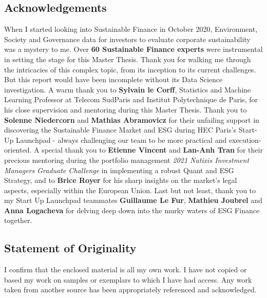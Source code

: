 \documentclass[12pt]{report}
\begin{document}
\begin{titlepage}
\section*{Acknowledgements}
When I started looking into Sustainable Finance in October 2020, Environment, Society and Governance data for investors to evaluate corporate sustainability was a mystery to me. Over \textbf{60 Sustainable Finance experts} were instrumental in setting the stage for this Master Thesis. Thank you for walking me through the intricacies of this complex topic, from its inception to its current challenges.\newline
\newline
But this report would have been incomplete without its Data Science investigation. A warm thank you to \textbf{Sylvain le Corff}, Statistics and Machine Learning Professor at Telecom SudParis and Institut Polytechnique de Paris, for his close supervision and mentoring during this Master Thesis.\newline  
Thank you to \textbf{Solenne Niedercorn} and \textbf{Mathias Abramovicz} for their unfailing support in discovering the Sustainable Finance Market and ESG during HEC Paris's Start-Up Launchpad - always challenging our team to be more practical and execution-oriented.\newline 
A special thank you to \textbf{Etienne Vincent} and \textbf{Lan-Anh Tran} for their precious mentoring during the portfolio management \textit{2021 Natixis Investment Managers Graduate Challenge} in implementing a robust Quant and ESG Strategy, and to  \textbf{Brice Royer} for his sharp insights on the market's legal aspects, especially within the European Union.
\newline
\newline
Last but not least, thank you to my Start Up Launchpad teammates \textbf{Guillaume Le Fur}, \textbf{Mathieu Joubrel} and \textbf{Anna Logacheva} for delving deep down into the murky waters of ESG Finance together.
\end{titlepage}
\begin{titlepage}
\section*{Statement of Originality}
I confirm that the enclosed material is all my own work. I have not copied or based my work on samples or exemplars to which I have had access. Any work taken from another source has been appropriately referenced and acknowledged.
\end{titlepage}
\end{document}
